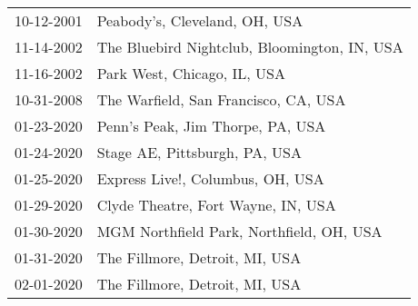 \begin{supertabular}{ll}
 10-12-2001 &                 Peabody's, Cleveland, OH, USA \\
 11-14-2002 &  The Bluebird Nightclub, Bloomington, IN, USA \\
 11-16-2002 &                   Park West, Chicago, IL, USA \\
 10-31-2008 &          The Warfield, San Francisco, CA, USA \\
 01-23-2020 &              Penn's Peak, Jim Thorpe, PA, USA \\
 01-24-2020 &                 Stage AE, Pittsburgh, PA, USA \\
 01-25-2020 &              Express Live!, Columbus, OH, USA \\
 01-29-2020 &            Clyde Theatre, Fort Wayne, IN, USA \\
 01-30-2020 &      MGM Northfield Park, Northfield, OH, USA \\
 01-31-2020 &                The Fillmore, Detroit, MI, USA \\
 02-01-2020 &                The Fillmore, Detroit, MI, USA \\
\end{supertabular}
